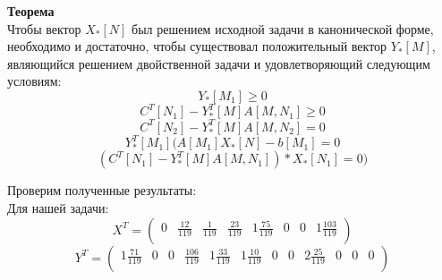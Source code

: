 \documentclass[../body.tex]{subfiles}
\begin{document}
	\textbf{Теорема}\\
	Чтобы вектор $X_{*}[N]$ был решением исходной задачи в канонической форме, необходимо и достаточно, чтобы существовал положительный вектор $Y_{*}[M]$, являющийся решением двойственной задачи и удовлетворяющий следующим условиям:
	\begin{equation}\label{eq:first}
		Y_{*}[M_1]\ge 0
	\end{equation}
	\begin{equation}\label{eq:second}
		C^{T}[N_1]-Y^{T}_{*}[M]A[M,N_1]\ge 0
	\end{equation}
	\begin{equation}\label{eq:third}
		C^{T}[N_2]-Y^{T}_{*}[M]A[M,N_2] = 0
	\end{equation}
	\begin{equation}\label{eq:fourth}
		Y^{T}_{*}[M_1](A[M_1]X_{*}[N]-b[M_1] = 0
	\end{equation}
	\begin{equation}\label{eq:fifth}
		(C^{T}[N_1]-Y^{T}_{*}[M]A[M,N_1])*X_{*}[N_1] = 0)
	\end{equation}

	Проверим полученные результаты:\\
	
	Для нашей задачи:\\
    $$X^T =  \begin{pmatrix} 	0 & \frac{12}{119} & \frac{1}{119} & \frac{23}{119} & 1\frac{75}{119} & 0 & 0 & 1\frac{103}{119} \\  \end{pmatrix}$$
	\setcounter{MaxMatrixCols}{20}
	$$Y^T =  \begin{pmatrix}	1\frac{71}{119} & 0 & 0 & \frac{106}{119} & 1\frac{33}{119} & 1\frac{10}{119} & 0 & 0 & 2\frac{25}{119} & 0 & 0 & 0\\ \end{pmatrix}$$
	\vspace{\baselineskip}
	
\end{document}
